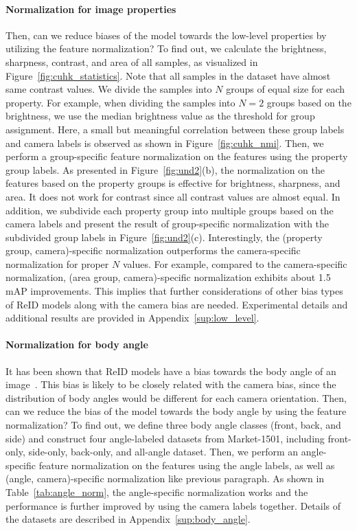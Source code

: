 \paragraph{Normalization for image properties}
Then, can we reduce biases of the model towards the low-level properties by utilizing the feature normalization?
To find out, we calculate the brightness, sharpness, contrast, and area of all samples, as visualized in Figure~\ref{fig:cuhk_statistics}. 
Note that all samples in the dataset have almost same contrast values.
We divide the samples into $N$ groups of equal size for each property.
For example, when dividing the samples into $N=2$ groups based on the brightness, we use the median brightness value as the threshold for group assignment.
Here, a small but meaningful correlation between these group labels and camera labels is observed as shown in Figure~\ref{fig:cuhk_nmi}.
Then, we perform a group-specific feature normalization on the features using the property group labels.
As presented in Figure~\ref{fig:und2}(b), the normalization on the features based on the property groups is effective for brightness, sharpness, and area.
It does not work for contrast since all contrast values are almost equal.
In addition, we subdivide each property group into multiple groups based on the camera labels and present the result of group-specific normalization with the subdivided group labels in Figure~\ref{fig:und2}(c).
Interestingly, the (property group, camera)-specific normalization outperforms the camera-specific normalization for proper $N$ values.
For example, compared to the camera-specific normalization, (area group, camera)-specific normalization exhibits about 1.5 mAP improvements.
This implies that further considerations of other bias types of ReID models along with the camera bias are needed.
Experimental details and additional results are provided in Appendix~\ref{sup:low_level}.

\paragraph{Normalization for body angle}
It has been shown that ReID models have a bias towards the body angle of an image~\citep{personx}.
This bias is likely to be closely related with the camera bias, since
the distribution of body angles would be different for each camera orientation.
Then, can we reduce the bias of the model towards the body angle by using the feature normalization?
To find out, we define three body angle classes (front, back, and side) and construct four angle-labeled datasets from Market-1501, including front-only, side-only, back-only, and all-angle dataset.
Then, we perform an angle-specific feature normalization on the features using the angle labels, as well as (angle, camera)-specific normalization like previous paragraph.
As shown in Table~\ref{tab:angle_norm}, the angle-specific normalization works and the performance is further improved by using the camera labels together.
Details of the datasets are described in Appendix~\ref{sup:body_angle}.


